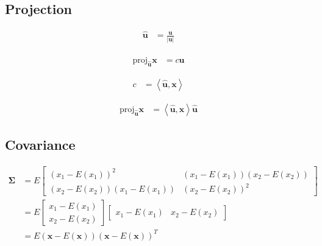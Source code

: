\documentclass{article}
\begin{document}
\subsection{Projection}

\begin{align}
	\hat{\mathbf{u}} & =\frac{\mathbf{u}}{\left|\mathbf{u}\right|}
\end{align}

\begin{align}
	\textrm{proj}_{\hat{\mathbf{u}}}\mathbf{x} & =c\hat{\mathbf{u}}
\end{align}

\begin{align}
	c & =\left\langle \hat{\mathbf{u}},\mathbf{x}\right\rangle 
\end{align}

\begin{align}
	\textrm{proj}_{\hat{\mathbf{u}}}\mathbf{x} & =\left\langle \hat{\mathbf{u}},\mathbf{x}\right\rangle \hat{\mathbf{u}}
\end{align}

\subsection{Covariance}

\begin{align}
	\mathbf{\Sigma} & =E\left[\begin{array}{cc}
		\left(x_{1}-E\left(x_{1}\right)\right)^{2} & \left(x_{1}-E\left(x_{1}\right)\right)\left(x_{2}-E\left(x_{2}\right)\right)\\
		\left(x_{2}-E\left(x_{2}\right)\right)\left(x_{1}-E\left(x_{1}\right)\right) & \left(x_{2}-E\left(x_{2}\right)\right)^{2}
	\end{array}\right]\\
	& =E\left[\begin{array}{c}
		x_{1}-E\left(x_{1}\right)\\
		x_{2}-E\left(x_{2}\right)
	\end{array}\right]\left[\begin{array}{cc}
		x_{1}-E\left(x_{1}\right) & x_{2}-E\left(x_{2}\right)\end{array}\right]\\
	& =E\left(\mathbf{x}-E\left(\mathbf{x}\right)\right)\left(\mathbf{x}-E\left(\mathbf{x}\right)\right)^{T}
\end{align}
\end{document}
